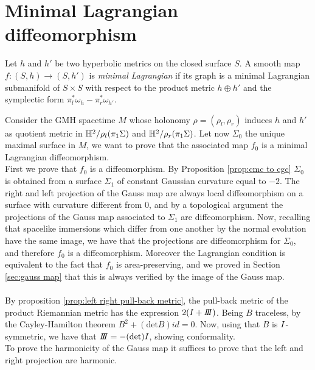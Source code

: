 \section{Minimal Lagrangian diffeomorphism}

\begin{definition}
    Let $h$ and $h'$ be two hyperbolic metrics on the closed surface $S$. A smooth map $f: (S,h) \to (S,h')$ is \textit{minimal Lagrangian} if its graph is a minimal Lagrangian submanifold of $S\times S$ with respect to the product metric $h \oplus h'$ and the symplectic form $\pi_l^*\omega_h - \pi_r^* \omega_{h'}$. 
\end{definition}

\red{|||}
Consider the GMH spacetime $M$ whose holonomy $\rho = (\rho_l, \rho_r)$ induces $h$ and $h'$ as quotient metric in $\mathbb{H}^2 / \rho_l(\pi_1 \Sigma)$ and $\mathbb{H}^2 / \rho_r(\pi_1 \Sigma)$. Let now $\Sigma_0$ the unique maximal surface in $M$, we want to prove that the associated map $f_0$ is a minimal Lagrangian diffeomorphism.\\
First we prove that $f_0$ is a diffeomorphism. By Proposition \ref{prop:cmc to cgc} $\Sigma_0$ is obtained from a surface $\Sigma_1$ of constant Gaussian curvature equal to $-2$. The right and left projection of the Gauss map are always local diffeomorphism on a surface with curvature different from $0$, and by a topological argument the projections of the Gauss map associated to $\Sigma_1$ are diffeomorphism. Now, recalling that spacelike immersions which differ from one another by the normal evolution have the same image, we have that the projections are diffeomorphism for $\Sigma_0$, and therefore $f_0$ is a diffeomorphism. Moreover the Lagrangian condition is equivalent to the fact that $f_0$ is area-preserving, and we proved in Section \ref{sec:gauss map} that this is always verified by the image of the Gauss map.\\
\\
By proposition \ref{prop:left right pull-back metric}, the pull-back metric of the product Riemannian metric has the expression $2(\I + \III)$. Being $B$ traceless, by the Cayley-Hamilton theorem $B^2 + (\text{det}B)id = 0$. Now, using that $B$ is $I$-symmetric, we have that $\III = -(\text{det})I$, showing conformality.\\
To prove the harmonicity of the Gauss map it suffices to prove that the left and right projection are harmonic. 
\red{|||}
